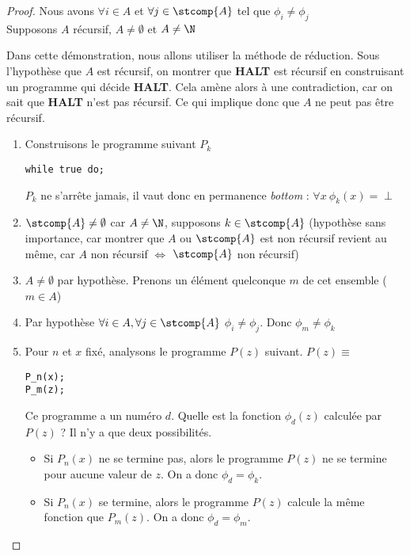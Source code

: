 \begin{proof}
Nous avons $\forall i \in A$ et $\forall j \in \stcomp{A}$ tel que $\phi_i \neq
\phi_j$\\
Supposons $A$ récursif, $A \neq \emptyset$ et $A\neq \N$

Dans cette démonstration, nous allons utiliser la méthode de réduction.
Sous l'hypothèse que $A$ est récursif, on montrer que \textbf{HALT} est récursif en construisant un programme qui décide \textbf{HALT}.  Cela amène alors à une contradiction, car on sait que \textbf{HALT} n'est pas récursif.  Ce qui implique donc que $A$ ne peut pas être récursif.

\begin{enumerate}
	\item Construisons le programme suivant $P_k$
		\begin{lstlisting}
while true do;
		\end{lstlisting}
			$P_k$ ne s'arrête jamais, il vaut donc en permanence \textit{bottom} : $\forall x \ \phi_k(x) = \perp$
			
	\item $\stcomp{A}\neq \emptyset$ car $A \neq \N$,
	supposons $k\in \stcomp{A}$ (hypothèse sans importance, car montrer que
	$A$ ou $\stcomp{A}$ est non récursif revient au même, car $A$ non
	récursif $ \Leftrightarrow $ $\stcomp{A}$ non récursif)
	\item $A\neq \emptyset$ par hypothèse.  Prenons un élément quelconque $m$ de cet ensemble  ($m\in A$)
	\item Par hypothèse  $\forall i \in A, \forall j \in \stcomp{A}$ $\phi_i \neq \phi_j$.  Donc 
		$\phi_m \neq \phi_k$
	\item Pour $n$ et $x$ fixé, analysons le programme $P(z)$ suivant. 
		$P(z) \equiv $
		\begin{lstlisting}
P_n(x);
P_m(z);
		\end{lstlisting}

			Ce programme a un numéro $d$.  Quelle est la fonction $\phi_d(z)$ calculée par $P(z)$ ? Il n'y a que deux possibilités.
			\begin{itemize}
				\item Si $P_n(x)$ ne se termine pas, alors le programme $P(z)$ ne se termine pour aucune valeur de $z$. On a donc $\phi_d =\phi_k$. 
				\item Si $P_n(x)$ se termine, alors le programme $P(z)$ calcule la même fonction que $P_m(z)$. On a donc $\phi_d =\phi_m$. 
			\end{itemize}


\end{enumerate}
\end{proof}
